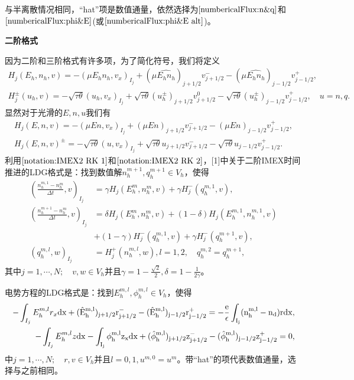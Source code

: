 \documentclass[lang=cn,newtx,10pt,scheme=chinese]{elegantbook}
\begin{document}
与半离散情况相同，“hat”项是数值通量，依然选择为$\ref{numbericalFlux:n&q}$和$\ref{numbericalFlux:phi&E}$(或$\ref{numbericalFlux:phi&E alt}$)。

\noindent \textbf{二阶格式}

因为二阶和三阶格式有许多项，为了简化符号，我们将定义
\begin{align}
    H_j(E_h,n_h,v) = - (\mu E_h n_h, v_x)_{I_j} + (\mu \hat{E_h n_h})_{j+1/2}v_{j+1/2}^- - (\mu \hat{E_h n_h})_{j-1/2}v_{j-1/2}^+, \label{notation:IMEX2 RK 1} \\
    H_j^{\pm}(u_h,v) =- \sqrt{\tau \theta}(u_h,v_x)_{I_j} + \sqrt{\tau\theta}(u_h^{\pm})_{j+1/2}v_{j+1/2}^0 - \sqrt{\tau\theta}(u_h^{\pm})_{j-1/2}v_{j-1/2}^+,\quad u = n,q.\label{notation:IMEX2 RK 2}
\end{align}
显然对于光滑的$E,n,u$我们有
\begin{align*}
    H_j(E,n,v) = -(\mu En,v_x)_{I_j} + (\mu En)_{j+1/2}v_{j+1/2}^- - (\mu En)_{j-1/2}v_{j-1/2}^+, \\
    H_j(E,n,v)^{\pm} = - \sqrt{\tau\theta}(u,v_x)_{I_j} + \sqrt{\tau\theta}u_{j+1/2}v_{j+1/2}^- - \sqrt{\tau\theta}u_{j-1/2}v_{j-1/2}^+.
\end{align*}
利用$\ref{notation:IMEX2 RK 1}$和$\ref{notation:IMEX2 RK 2}$，[1]中关于二阶IMEX时间推进的LDG格式是：找到数值解$n_h^{m+1},q_h^{m+1}\in V_h$，使得
\begin{align}
    (\frac{n_h^{m,1} -n_h^m}{\Delta t},v)_{I_j} & = \gamma H_j(E_h^m,n_h^m,v) + \gamma H_j^-(q_h^{m,1},v),                     \label{weakForm:IMEX2 LDG 1} \\
    (\frac{n_h^{m+1} -n_h^m}{\Delta t},v)_{I_j} & = \delta H_j(E_h^m,n_h^m,v) + (1-\delta)H_j(E_h^{m,1},n_h^{m,1},v) \nonumber                              \\
                                                & +(1-\gamma)H_j^-(q_h^{m,1},v) + \gamma H_j^-(q_h^{m+1},v),                                                \\
    (q_h^{m,l},w)_{I_j}                         & = H_j^+(n_h^{m,l},w), l = 1,2, \quad q_h^{m,2} = q_h^{m+1},\label{weakForm:IMEX2 LDG 3}
\end{align}
其中$j = 1,\cdots,N;\quad v,w \in V_h$并且$\gamma = 1- \frac{\sqrt{2}}{2},\delta = 1 - \frac{1}{2\gamma}$。

电势方程的LDG格式是：找到$E_h^{m,l},\phi_h^{m,l} \in V_h$，使得
\begin{align}
    -\int_{I_j} E_h^{m,l}r_x \rm{d}x + (\hat{E}_h^{m,l})_{j+1/2}r_{j+1/2}^- - (\hat{E}_h^{m,l})_{j-1/2}r_{j-1/2}^+ = -\frac{e}{\epsilon}\int_{I_j}(n_h^{m,l} - n_d) r\rm{d} x, \label{equation:IMEX2 LDG:EPE 1} \\
    -\int_{I_j} E_h^{m,l}z \rm{d}x - \int_{I_j} \phi_h^{m,l}z_x \rm{d}x  + (\hat{\phi}_h^{m,l})_{j+1/2}z^-_{j+1/2} - (\hat{\phi}_h^{m,l})_{j-1/2}z_{j-1/2}^+  = 0, \label{equation:IMEX2 LDG:EPE 2}
\end{align}
中$j = 1,\cdots,N;\quad r,v \in V_h$并且$l = 0,1, u^{m,0} = u^m$。带“hat”的项代表数值通量，选择与之前相同。
\end{document}
